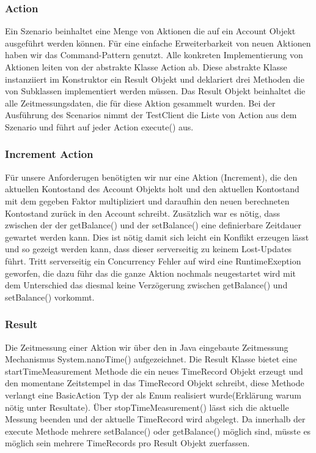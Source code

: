 \subsubsection{Action}
\label{sec:action}
Ein Szenario beinhaltet eine Menge von Aktionen die auf ein Account Objekt ausgeführt werden können. Für eine einfache Erweiterbarkeit von neuen Aktionen haben wir das Command-Pattern genutzt. Alle konkreten Implementierung von Aktionen leiten von der abstrakte Klasse Action ab. Diese abstrakte Klasse instanziiert im Konstruktor ein Result Objekt und deklariert drei Methoden die von Subklassen implementiert werden müssen. Das Result Objekt beinhaltet die alle Zeitmessungsdaten, die für diese Aktion gesammelt wurden. Bei der Ausführung des Scenarios nimmt der TestClient die Liste von Action aus dem Szenario und führt auf jeder Action execute() aus.
 
\subsubsection{Increment Action}
\label{sec:incrementAction}
Für unsere Anforderugen benötigten wir nur eine Aktion (Increment), die den aktuellen Kontostand des Account Objekts holt und den aktuellen Kontostand mit dem gegeben Faktor multipliziert und daraufhin den neuen berechneten Kontostand zurück in den Account schreibt. Zusätzlich war es nötig, dass zwischen der der getBalance() und der setBalance() eine definierbare Zeitdauer gewartet werden kann. Dies ist nötig damit sich leicht ein Konflikt erzeugen lässt und so gezeigt werden kann, dass dieser serverseitig zu keinem Lost-Updates führt. Tritt serverseitig ein Concurrency Fehler auf wird eine RuntimeExeption geworfen, die dazu führ das die ganze Aktion nochmals neugestartet wird mit dem Unterschied das diesmal keine Verzögerung zwischen getBalance() und setBalance() vorkommt.

\subsubsection{Result}
\label{sec:result}
Die Zeitmessung einer Aktion wir über den in Java eingebaute Zeitmessung Mechanismus System.nanoTime() aufgezeichnet. Die Result Klasse bietet eine startTimeMeasurement Methode die ein neues TimeRecord Objekt erzeugt und den momentane Zeitstempel in das TimeRecord Objekt schreibt, diese Methode verlangt eine BasicAction Typ der als Enum realisiert wurde(Erklärung warum nötig unter Resultate). Über stopTimeMeasurement() lässt sich die aktuelle Messung beenden und der aktuelle TimeRecord wird abgelegt. Da innerhalb der execute Methode mehrere setBalance() oder getBalance() möglich sind, müsste es möglich sein mehrere TimeRecords pro Result Objekt zuerfassen.




